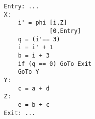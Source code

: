 \footnotesize
\begin{verbatim}
Entry: ...
X:
	i' = phi [i,Z] 
             [0,Entry]
	q = (i'== 3)
	i = i' + 1
	b = i + 3
	if (q == 0) GoTo Exit
	GoTo Y
Y: 
	c = a + d
Z:
	e = b + c
Exit: ...

\end{verbatim}
\normalsize
